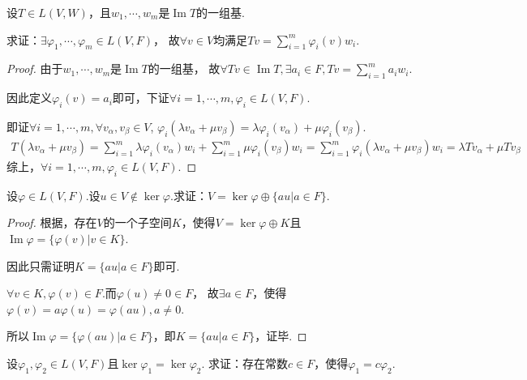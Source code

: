 \begin{problem}[28]\label{3.B.28}
    设\(T \in L(V,W)\)，且\(w_1,\cdots,w_m\)是\(\operatorname{Im} T\)的一组基.

    求证：\(\exists \varphi_1,\cdots,\varphi_m \in L(V,F)\)，
    故\(\forall v \in V\)均满足\(Tv=\sum_{i=1}^m{\varphi_i(v)w_i}\).
\end{problem}

\begin{proof}
    由于\(w_1,\cdots,w_m\)是\(\operatorname{Im} T\)的一组基，
    故\(\forall Tv \in \operatorname{Im} T,\exists a_i \in F,Tv=\sum_{i=1}^m a_iw_i\).
    
    因此定义\(\varphi_i(v)=a_i\)即可，下证\(\forall i=1,\cdots,m,\varphi_i \in L(V,F)\).
    
    即证\(\forall i=1,\cdots,m,\forall v_\alpha,v_\beta \in V\),
    \(\varphi_i(\lambda v_\alpha+\mu v_\beta)=\lambda \varphi_i(v_\alpha)+\mu \varphi_i(v_\beta)\).
    \begin{align*}
        T(\lambda v_\alpha+\mu v_\beta)=\sum_{i=1}^m \lambda \varphi_i(v_\alpha)w_i+\sum_{i=1}^m \mu \varphi_i(v_\beta)w_i
        =\sum_{i=1}^m \varphi_i(\lambda v_\alpha+\mu v_\beta)w_i=\lambda Tv_\alpha+\mu Tv_\beta
    \end{align*}
    综上，\(\forall i=1,\cdots,m,\varphi_i \in L(V,F)\).    
\end{proof}

\begin{problem}[29]\label{3.B.29}
    设\(\varphi \in L(V,F)\).设\(u \in V \notin \ker \varphi\).求证：\(V=\ker \varphi \oplus \{au|a \in F\}\).
\end{problem}

\begin{proof}
    根据，存在\(V\)的一个子空间\(K\)，使得\(V=\ker \varphi \oplus K\)且\(\operatorname{Im} \varphi=\{\varphi (v)|v \in K\}\).
    
    因此只需证明\(K=\{au|a \in F\}\)即可.
    
    \(\forall v \in K,\varphi(v) \in F\).而\(\varphi(u) \ne 0 \in F\)，
    故\(\exists a \in F\)，使得\(\varphi(v)=a \varphi(u)=\varphi(au),a \ne 0\).

    所以\(\operatorname{Im} \varphi=\{\varphi (au)|a \in F\}\)，即\(K=\{au|a \in F\}\)，证毕.    
\end{proof}

\begin{problem}[30]\label{3.B.30}
    设\(\varphi_1,\varphi_2 \in L(V,F)\)且\(\ker \varphi_1=\ker \varphi_2\).
    求证：存在常数\(c \in F\)，使得\(\varphi_1=c \varphi_2\).    
\end{problem}


